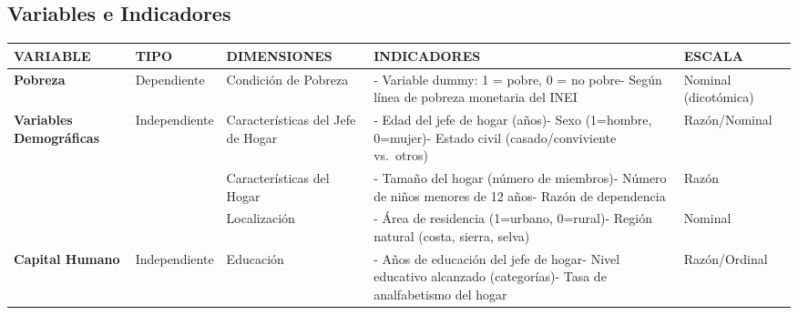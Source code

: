 \documentclass[
  man,
  floatsintext,
  longtable,
  a4paper,
  nolmodern,
  notxfonts,
  notimes,
  12pt,
  colorlinks=true,linkcolor=blue,citecolor=blue,urlcolor=blue]{apa7}
\newcounter{none} %
\begin{document}
\subsection{Variables e Indicadores}\label{variables-e-indicadores-9}

{\def\LTcaptype{none} %
\begin{longtable}[]{@{}
  >{\raggedright\arraybackslash}p{}
  >{\raggedright\arraybackslash}p{}
  >{\raggedright\arraybackslash}p{}
  >{\raggedright\arraybackslash}p{}
  >{\raggedright\arraybackslash}p{}@{}}
\toprule\noalign{}
\begin{minipage}[b]{\linewidth}\raggedright
VARIABLE
\end{minipage} & \begin{minipage}[b]{\linewidth}\raggedright
TIPO
\end{minipage} & \begin{minipage}[b]{\linewidth}\raggedright
DIMENSIONES
\end{minipage} & \begin{minipage}[b]{\linewidth}\raggedright
INDICADORES
\end{minipage} & \begin{minipage}[b]{\linewidth}\raggedright
ESCALA
\end{minipage} \\
\midrule\noalign{}
\endhead
\bottomrule\noalign{}
\endlastfoot
\textbf{Pobreza} & Dependiente & Condición de Pobreza & - Variable
dummy: 1 = pobre, 0 = no pobre- Según línea de pobreza monetaria del
INEI & Nominal (dicotómica) \\
\textbf{Variables Demográficas} & Independiente & Características del
Jefe de Hogar & - Edad del jefe de hogar (años)- Sexo (1=hombre,
0=mujer)- Estado civil (casado/conviviente vs.~otros) & Razón/Nominal \\
& & Características del Hogar & - Tamaño del hogar (número de miembros)-
Número de niños menores de 12 años- Razón de dependencia & Razón \\
& & Localización & - Área de residencia (1=urbano, 0=rural)- Región
natural (costa, sierra, selva) & Nominal \\
\textbf{Capital Humano} & Independiente & Educación & - Años de
educación del jefe de hogar- Nivel educativo alcanzado (categorías)-
Tasa de analfabetismo del hogar & Razón/Ordinal \\

\end{longtable}}
\end{document}
